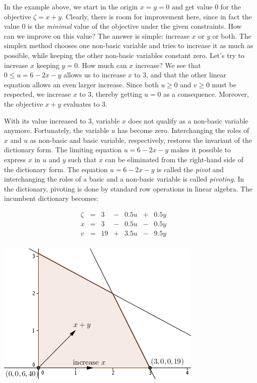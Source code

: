 \documentclass[ukenglish,a4]{article}
\begin{document}
In the example above, we start in the origin $x=y=0$ and get
value $0$ for the objective $\zeta = x + y$.
Clearly, there is room for improvement here, since in fact
the value $0$ is the \emph{minimal} value of the objective
under the given constraints. How can we improve on this
value? The answer is simple: increase $x$ or $y$ or both.
The simplex method chooses one non-basic variable and
tries to increase it as much as possible, while keeping the
other non-basic variables constant zero.
Let's try to increase $x$ keeping $y=0$. How much can $x$ increase?
We see that $0 \leq u = 6 -2x-y$ allows us to increase $x$ to $3$,
and that the other linear equation allows an even larger increase. Since both
$u\geq 0$ and $v\geq 0$ must be respected, we increase $x$ to $3$,
thereby getting $u=0$ as a consequence. Moreover, the objective $x+y$ evaluates to 3.

With its value increased to $3$, variable $x$ does not qualify as a non-basic variable anymore.
Fortunately, the variable $u$ has become zero. Interchanging the roles of
$x$ and $u$ as non-basic and basic variable, respectively, restores 
the invariant of the dictionary form. The limiting equation $u = 6 -2x-y$ makes it
possible to express $x$ in $u$ and $y$ such that $x$ can be eliminated from the
right-hand side of the dictionary form. The equation $u = 6 -2x-y$ is
called the \emph{pivot} and interchanging the roles of
a basic and a non-basic variable is called \emph{pivoting}.
In the dictionary, pivoting is done by standard row operations in linear algebra. 
The incumbent dictionary becomes:

	\begin{minipage}{.45\textwidth}
\[    
    \begin{array}{lcrcrcrcr}
      \zeta&=& 3 &-& 0.5 u &+& 0.5 y & &  \\\hline
      x    &=& 3 &-& 0.5 u &-& 0.5 y & &  \\
      v    &=& 19&+& 3.5 u &-& 9.5 y & &  \\

    \end{array}
\]
\end{minipage}
	\begin{minipage}{.45\textwidth}
				\includegraphics{ex2.jpg}
\end{minipage}
\vspace{.2cm}
\end{document}
